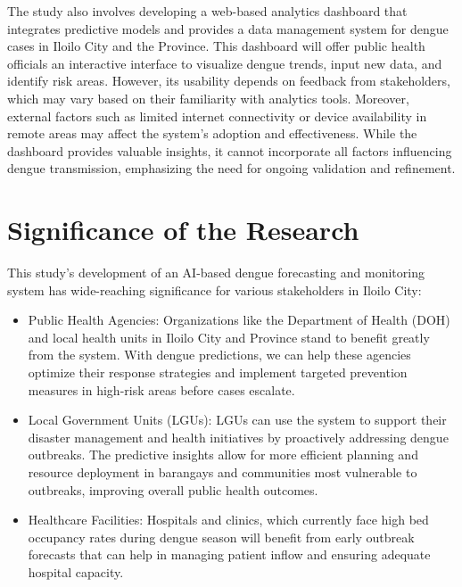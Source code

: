 The study also involves developing a web-based analytics dashboard that integrates predictive models and provides a data management system for dengue cases in Iloilo City and the Province. This dashboard will offer public health officials an interactive interface to visualize dengue trends, input new data, and identify risk areas. However, its usability depends on feedback from stakeholders, which may vary based on their familiarity with analytics tools. Moreover, external factors such as limited internet connectivity or device availability in remote areas may affect the system's adoption and effectiveness. While the dashboard provides valuable insights, it cannot incorporate all factors influencing dengue transmission, emphasizing the need for ongoing validation and refinement.


\section{Significance of the Research}
\label{sec:significance}

This study’s development of an AI-based dengue forecasting and monitoring system has wide-reaching significance for various stakeholders in Iloilo City:

\begin{itemize}
	\item  Public Health Agencies: Organizations like the Department of Health (DOH) and local health units in Iloilo City and Province stand to benefit greatly from the system. With dengue predictions, we can help these agencies optimize their response strategies and implement targeted prevention measures in high-risk areas before cases escalate.
\end{itemize}

\begin{itemize} 
	\item Local Government Units (LGUs): LGUs can use the system to support their disaster management and health initiatives by proactively addressing dengue outbreaks. The predictive insights allow for more efficient planning and resource deployment in barangays and communities most vulnerable to outbreaks, improving overall public health outcomes.
\end{itemize}


\begin{itemize} 
	\item Healthcare Facilities: Hospitals and clinics, which currently face high bed occupancy rates during dengue season will benefit from early outbreak forecasts that can help in managing patient inflow and ensuring adequate hospital capacity. 
\end{itemize}


